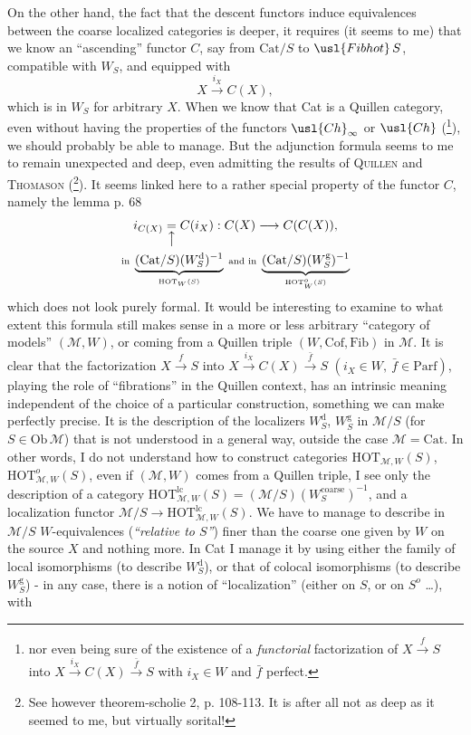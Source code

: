 On the other hand, the fact that the descent functors induce equivalences between the coarse localized categories is deeper, it requires (it seems to me) that we know an ``ascending'' functor $C$, say from $\mathrm{Cat}/S$ to $\usl{Fibhot}\,S$, compatible with $W_S$, and equipped with
\[
X \xrightarrow{i_X} C(X),
\]
which is in $W_S$ for arbitrary $X$. When we know that Cat is a Quillen category, even without having the properties of the functors $\usl{Ch}_\infty$ or $\usl{Ch}$ (\footnote[52]{nor even being sure of the existence of a \textit{functorial} factorization of $X \xrightarrow{f} S$ into $X \xrightarrow{i_X} C(X) \xrightarrow{\bar{f}} S$ with $i_X \in W$ and $\bar{f}$ perfect.}), we should probably
be able to manage. But the adjunction formula seems to me to remain unexpected and deep, even admitting the results of \textsc{Quillen} and \textsc{Thomason} (\footnote[53]{See however theorem-scholie 2, p. 108-113. It is after all not as deep as it seemed to me, but virtually sorital!}). It seems linked here to a rather special property of the functor $C$, namely the lemma p. 68
\[
\begin{gathered}
i_{C(X)} \underset{\big\uparrow}{=} C(i_X) : C(X) \longrightarrow C(C(X)),\\
\scriptstyle \text{in } \underbrace{(\mathrm{Cat}/S)(W_S^{\mathrm{d}})^{-1}}_{\mathrm{HOT}_W(S)} \text{ and in } \underbrace{(\mathrm{Cat}/S)(W_S^{\mathrm{g}})^{-1}}_{\mathrm{HOT}^{o}_{W}(S)}
\end{gathered}
\]
which does not look purely formal. It would be interesting to examine to what extent this formula still makes sense in a more or less arbitrary ``category of models'' $(\mathcal{M},W)$, or coming from a Quillen triple $(W,\mathrm{Cof},\mathrm{Fib})$ in $\mathcal{M}$. It is clear that the factorization $X \xrightarrow{f} S$ into $X \xrightarrow{i_X} C(X) \xrightarrow{\bar{f}} S$ $(i_X \in W,\ \bar{f} \in \mathrm{Parf})$, playing the role of ``fibrations'' in the Quillen context, has an intrinsic meaning independent of the choice of a particular construction, something we can make perfectly precise. It is the description of the localizers $W_S^{\mathrm{d}}$, $W_S^{\mathrm{g}}$ in $\mathcal{M}/S$ (for $S \in \mathrm{Ob}\,\mathcal{M}$) that is not understood in a general way, outside the case $\mathcal{M} = \mathrm{Cat}$. In other words, I do not understand how to construct categories $\mathrm{HOT}_{\mathcal{M},W}(S)$, $\mathrm{HOT}^{o}_{\mathcal{M},W}(S)$, even if $(\mathcal{M},W)$ comes from a Quillen triple, I see only the description of a category $\mathrm{HOT}^{\mathrm{lc}}_{\mathcal{M},W}(S) = (\mathcal{M}/S)(W_S^{\text{coarse}})^{-1}$, and a localization functor $\mathcal{M}/S \longrightarrow \mathrm{HOT}^{\mathrm{lc}}_{\mathcal{M},W}(S)$. We have to manage to describe in $\mathcal{M}/S$ $W$-equivalences (\textit{``relative to $S$''}) finer than the coarse one given by $W$ on the source $X$ and nothing more. In Cat I manage it by using either the family of local isomorphisms (to describe $W_S^{\mathrm{d}}$), or that of colocal isomorphisms (to describe $W_S^{\mathrm{g}}$) - in any case, there is a notion of ``localization'' (either on $S$, or on $S^{o}$ \dots), with %
